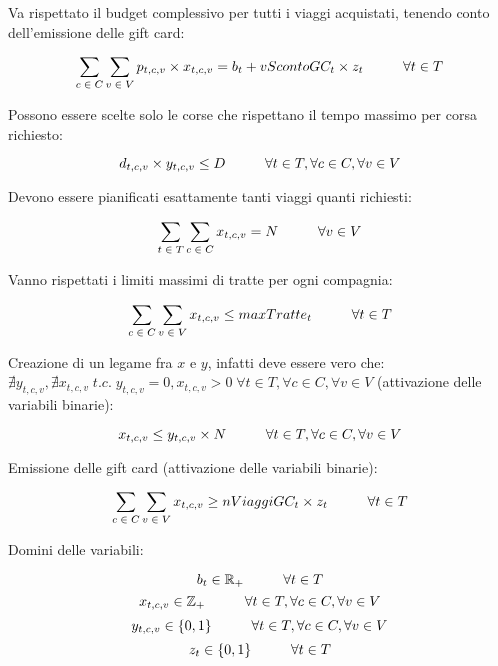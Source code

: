 \documentclass[main.tex]{subfiles}
\begin{document}
Va rispettato il budget complessivo per tutti i viaggi acquistati, tenendo conto dell'emissione delle gift card:
\begin{tcolorbox}
$$\sum_{c\; \in\; C} \sum_{v\; \in\; V} p_{t,c,v} \times{} x_{t,c,v} = b_t + vScontoGC_t \times{} z_t \hspace{10mm} \forall{} t \in T$$
\end{tcolorbox}

Possono essere scelte solo le corse che rispettano il tempo massimo per corsa richiesto:
\begin{tcolorbox}
$$d_{t,c,v} \times{} y_{t,c,v} \leq D \hspace{10mm} \forall{} t \in T, \forall{} c \in C, \forall{} v \in V$$
\end{tcolorbox}

Devono essere pianificati esattamente tanti viaggi quanti richiesti:
\begin{tcolorbox}
$$\sum_{t\; \in\; T} \sum_{c\; \in\; C} x_{t,c,v} = N \hspace{10mm} \forall{} v \in V$$
\end{tcolorbox}

Vanno rispettati i limiti massimi di tratte per ogni compagnia:
\begin{tcolorbox}
$$\sum_{c\; \in\; C} \sum_{v\; \in\; V} x_{t,c,v} \leq maxTratte_t \hspace{10mm} \forall{} t \in T$$
\end{tcolorbox}

Creazione di un legame fra $x$ e $y$, infatti deve essere vero che: $\nexists y_{t,c,v}, \nexists x_{t,c,v}\; t.c.\; y_{t,c,v} = 0, x_{t,c,v} > 0\; \forall{} t \in T, \forall{} c \in C, \forall{} v \in V$ (attivazione delle variabili binarie):
\begin{tcolorbox}
$$x_{t,c,v} \leq y_{t,c,v} \times{} N \hspace{10mm} \forall{} t \in T, \forall{} c \in C, \forall{} v \in V$$
\end{tcolorbox}

Emissione delle gift card (attivazione delle variabili binarie):
\begin{tcolorbox}
$$\sum_{c\; \in\; C} \sum_{v\; \in\; V} x_{t,c,v} \geq nViaggiGC_t \times z_t \hspace{10mm} \forall{} t \in T$$
\end{tcolorbox}

Domini delle variabili:
\begin{tcolorbox}
$$b_t \in \mathbb{R}_+ \hspace{10mm} \forall{} t \in T$$
$$x_{t,c,v} \in \mathbb{Z}_+ \hspace{10mm} \forall{} t \in T, \forall{} c \in C, \forall{} v \in V$$
$$y_{t,c,v} \in \{0,1\} \hspace{10mm} \forall{} t \in T, \forall{} c \in C, \forall{} v \in V$$
$$z_t \in \{0,1\} \hspace{10mm} \forall{} t \in T$$
\end{tcolorbox}
\end{document}
